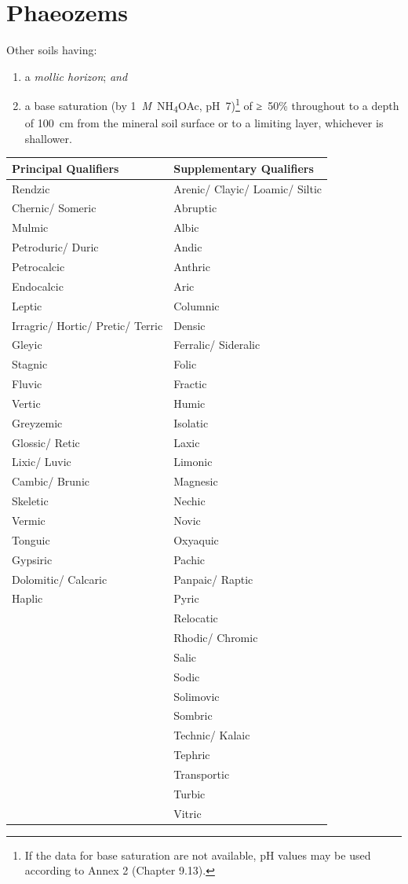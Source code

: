 \documentclass[
  letterpaper,
  DIV=11,
  numbers=noendperiod]{scrreprt}
\providecommand{\tightlist}{%
  \setlength{\itemsep}{0pt}\setlength{\parskip}{0pt}}\usepackage{longtable,booktabs,array}
\begin{document}

\hypertarget{key-phaeozems}{%
\chapter{Phaeozems}\label{key-phaeozems}}

Other soils having:

\begin{enumerate}
\def\labelenumi{\arabic{enumi}.}
\tightlist
\item
  a \emph{mollic horizon}; \emph{and}
\item
  a base saturation (by 1~\emph{M}~NH\textsubscript{4}OAc,
  pH~7)\footnote{If the data for base saturation are not available, pH
    values may be used according to Annex 2 (Chapter 9.13).} of ≥~50\%
  throughout to a depth of 100~cm from the mineral soil surface or to a
  limiting layer, whichever is shallower.
\end{enumerate}

\begin{longtable}[]{@{}ll@{}}
\toprule()
Principal Qualifiers & Supplementary Qualifiers \\
\midrule()
\endhead
Rendzic & Arenic/ Clayic/ Loamic/ Siltic \\
Chernic/ Someric & Abruptic \\
Mulmic & Albic \\
Petroduric/ Duric & Andic \\
Petrocalcic & Anthric \\
Endocalcic & Aric \\
Leptic & Columnic \\
Irragric/ Hortic/ Pretic/ Terric & Densic \\
Gleyic & Ferralic/ Sideralic \\
Stagnic & Folic \\
Fluvic & Fractic \\
Vertic & Humic \\
Greyzemic & Isolatic \\
Glossic/ Retic & Laxic \\
Lixic/ Luvic & Limonic \\
Cambic/ Brunic & Magnesic \\
Skeletic & Nechic \\
Vermic & Novic \\
Tonguic & Oxyaquic \\
Gypsiric & Pachic \\
Dolomitic/ Calcaric & Panpaic/ Raptic \\
Haplic & Pyric \\
& Relocatic \\
& Rhodic/ Chromic \\
& Salic \\
& Sodic \\
& Solimovic \\
& Sombric \\
& Technic/ Kalaic \\
& Tephric \\
& Transportic \\
& Turbic \\
& Vitric \\
\bottomrule()
\end{longtable}
\end{document}
